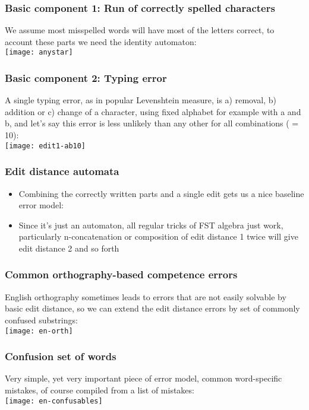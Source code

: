 \documentclass{beamer}
\begin{document}
\begin{frame}
    \frametitle{Basic component 1: Run of correctly spelled characters}
    We assume most misspelled words will have most of the letters correct,
    to account these parts we need the identity automaton:\\
    \texttt{[image: anystar]}
\end{frame}

\begin{frame}
    \frametitle{Basic component 2: Typing error}
    A single typing error, as in popular Levenshtein measure, is
    a) removal, b) addition or c) change of a character, using fixed alphabet
    for example with a and b, and let's say this error is less unlikely than
    any other for all combinations ( = 10):\\
    \texttt{[image: edit1-ab10]}
\end{frame}


\begin{frame}
    \frametitle{Edit distance automata}
    \begin{itemize}
        \item Combining the correctly written parts and a single edit gets us
            a nice baseline error model: 
        \item Since it's just an automaton, all regular tricks of FST algebra
            just work, particularly n-concatenation or composition of edit 
            distance 1 twice will give edit distance 2 and so forth
    \end{itemize}
\end{frame}


\begin{frame}
    \frametitle{Common orthography-based competence errors}
    English orthography sometimes leads to errors that are not
    easily solvable by basic edit distance, so we can extend the
    edit distance errors by set of commonly confused substrings:\\
    \texttt{[image: en-orth]}
\end{frame}

\begin{frame}
    \frametitle{Confusion set of words}
    Very simple, yet very important piece of error model, common word-specific
    mistakes, of course compiled from a list of mistakes:\\
    \texttt{[image: en-confusables]}
\end{frame}
\end{document}
